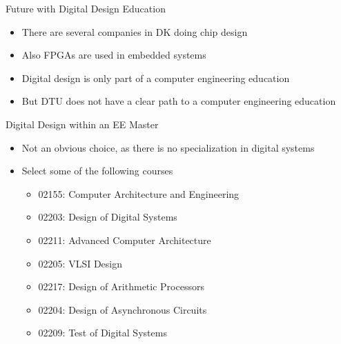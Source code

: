 \begin{frame}[fragile]{Future with Digital Design Education}
\begin{itemize}
\item There are several companies in DK doing chip design
\item Also FPGAs are used in embedded systems
\item Digital design is only part of a computer engineering education
\item But DTU does not have a clear path to a computer engineering education
\end{itemize}
\end{frame}

\begin{frame}[fragile]{Digital Design within an EE Master}
\begin{itemize}
\item Not an obvious choice, as there is no specialization in digital systems
\item Select some of the following courses
\begin{itemize}
\item 02155: Computer Architecture and Engineering
\item 02203: Design of Digital Systems
\item 02211: Advanced Computer Architecture
\item 02205: VLSI Design
\item 02217: Design of Arithmetic Processors
\item 02204: Design of Asynchronous Circuits
\item 02209: Test of Digital Systems
\end{itemize}
\end{itemize}
\end{frame}

